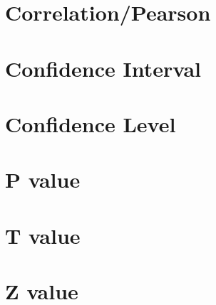 \section{Correlation/Pearson}

\section{Confidence Interval}

\section{Confidence Level}

\section{P value}

\section{T value}

\section{Z value}




